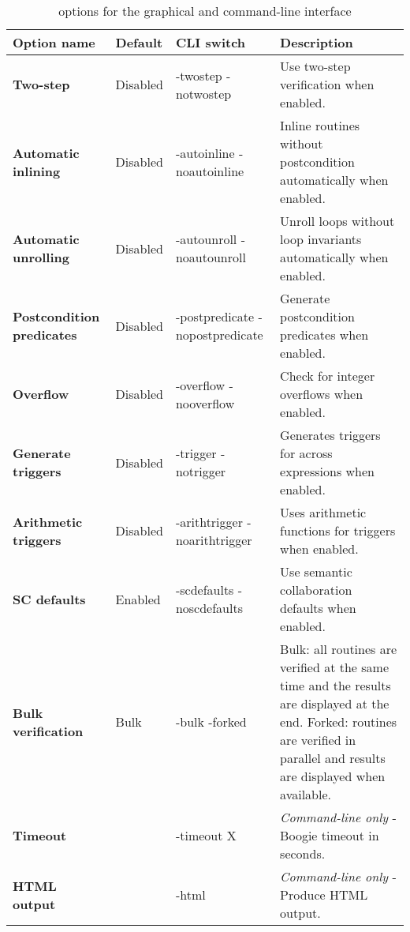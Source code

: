 \begin{sidewaystable}
\centering
\begin{tabular}{>{\bfseries}llp{3cm}p{9cm}}
\textbf{Option name} & \textbf{Default} & \textbf{CLI switch} & \textbf{Description} \\
\hline
Two-step & Disabled & -twostep \newline -notwostep & Use two-step verification when enabled. \\ 
\hline
Automatic inlining & Disabled & -autoinline \newline -noautoinline & Inline routines without postcondition automatically when enabled. \\ 
\hline
Automatic unrolling & Disabled & -autounroll \newline -noautounroll & Unroll loops without loop invariants automatically when enabled. \\ 
\hline
Postcondition predicates & Disabled & -postpredicate \newline -nopostpredicate & Generate postcondition predicates when enabled. \\ 
\hline
Overflow & Disabled & -overflow \newline -nooverflow & Check for integer overflows when enabled. \\ 
\hline
Generate triggers & Disabled & -trigger \newline -notrigger & Generates triggers for across expressions when enabled. \\ 
\hline
Arithmetic triggers & Disabled & -arithtrigger \newline -noarithtrigger & Uses arithmetic functions for triggers when enabled. \\ 
\hline
SC defaults & Enabled & -scdefaults \newline -noscdefaults & Use semantic collaboration defaults when enabled. \\ 
\hline
Bulk verification & Bulk & -bulk \newline -forked & Bulk: all routines are verified at the same time and the results are displayed at the end. \newline Forked: routines are verified in parallel and results are displayed when available. \\ 
\hline
Timeout &  & -timeout X & \emph{Command-line only} - Boogie timeout in seconds. \\ 
\hline
HTML output &  & -html & \emph{Command-line only} - Produce HTML output. \\ 
\hline

\end{tabular}
\caption{\AutoProof options for the graphical and command-line interface}
\label{tab:manual:options}
\end{sidewaystable}



